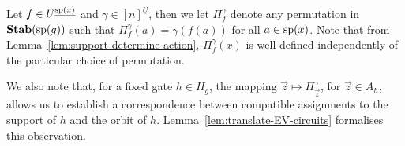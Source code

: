 \documentclass[../paper.tex]{subfiles}
\begin{document}



Let $f
\in U^{\underline{\text{sp}(x)}}$ and $\gamma \in [n]^{\underline{U}}$, then we let
$\Pi^{\gamma}_{f}$ denote any permutation in $\text{\textbf{Stab}} (\text{sp} (g))$ such that
$\Pi^{\gamma}_f (a) = \gamma (f(a))$ for all $a \in \text{sp}(x)$. Note that from
Lemma~\ref{lem:support-determine-action}, $\Pi^{\gamma}_f(x)$ is well-defined
independently of the particular choice of permutation.

We also note that, for a fixed gate $h \in H_g$, the mapping $\vec{z} \mapsto
\Pi^{\gamma}_{\vec{z}}$, for $\vec{z} \in A_h$, allows us to establish a
correspondence between compatible assignments to the support of $h$ and the
orbit of $h$. Lemma~\ref{lem:translate-EV-circuits} formalises this observation.
\end{document}
